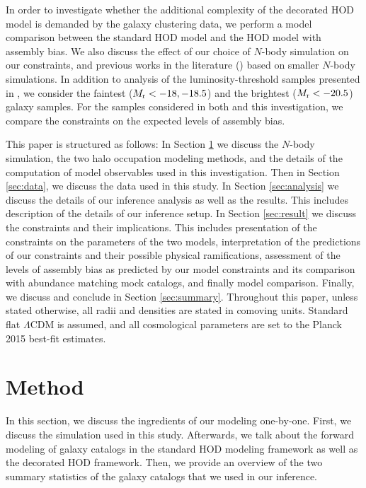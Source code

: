 \documentclass[12pt, preprint]{aastex}
\begin{document}
In order to investigate whether the additional complexity of the decorated HOD model is demanded by the galaxy clustering data, we perform a model comparison between the standard HOD model and the HOD model with assembly bias. We also discuss the effect of our choice of $N$-body simulation on our constraints, and previous works in the literature (\citealt{zentner2016}) based on smaller $N$-body simulations. In addition to analysis of the luminosity-threshold samples presented in \citet{zentner2016}, we consider the faintest ($M_{\rm r} < -18,-18.5$) and the brightest ($M_{\rm r}<-20.5$) galaxy samples. For the samples considered in both \citet{zentner2016} and this investigation, we compare the constraints on the expected levels of assembly bias. 



This paper is structured as follows: In Section \ref{sec:method} we discuss the $N$-body simulation, the two halo occupation modeling methods, and the details of the computation of model observables used in this investigation. Then in Section \ref{sec:data}, we discuss the data used in this study. 
In Section \ref{sec:analysis} we discuss the details of our inference analysis as well as the results. This includes description of the details of our inference setup. In Section \ref{sec:result} we discuss the constraints and their implications. This includes presentation of the constraints on the parameters of the two models, interpretation of the predictions of our constraints and their possible physical ramifications, assessment of the levels of assembly bias as predicted by our model constraints and its comparison with abundance matching mock catalogs, and finally model comparison. Finally, we discuss and conclude in Section \ref{sec:summary}.
Throughout this paper, unless stated otherwise, 
all radii and densities are stated in comoving units. 
Standard flat $\Lambda$CDM is assumed, and all cosmological 
parameters are set to the Planck 2015 best-fit estimates.

\section{Method}\label{sec:method}

In this section, we discuss the ingredients of our modeling one-by-one. First, we discuss the simulation used in this study. Afterwards, we talk about the forward modeling of galaxy catalogs in the standard HOD modeling framework as well as the decorated HOD framework. Then, we provide an overview of the two summary statistics of the galaxy catalogs that we used in our inference.  
\end{document}
